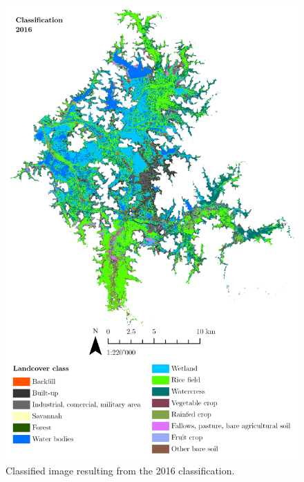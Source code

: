 \documentclass[11pt, A4, oneside]{report}
\begin{document}
\begin{figure}
\includegraphics{figures/3_results/classi2016.png}
\caption{Classified image resulting from the 2016 classification.}
\label{fig:cls16}
\end{figure}
\end{document}
